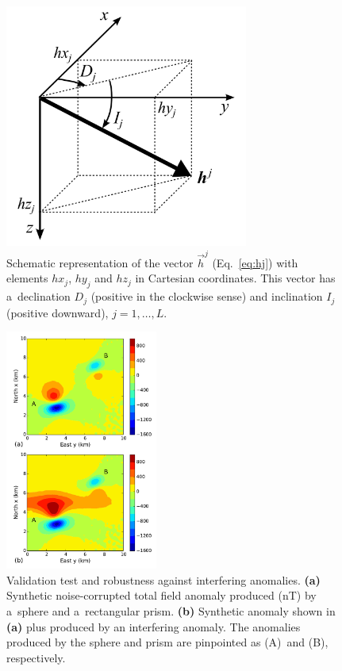 \documentclass[journal abbreviation, npg]{copernicus}
\begin{document}
\begin{figure}[t]
\includegraphics[width=80mm]{Figures/npgd-2014-0069-f02}
\caption{Schematic representation of the vector $\vec{h}^{j}$
  (Eq.~\ref{eq:hj}) with elements $hx_{j}$, $hy_{j}$ and $hz_{j}$ in
  Cartesian coordinates. This vector has a~declination $D_{j}$
  (positive in the clockwise sense) and inclination $I_{j}$ (positive
  downward), $j = 1, \ldots, L$.}
\label{fig:spherical-coordinates}
\end{figure}

\begin{figure}[t]
\includegraphics[width=50mm]{Figures/npgd-2014-0069-f03}
\caption{Validation test and robustness against interfering
  anomalies. \textbf{(a)} Synthetic noise-corrupted total field
  anomaly produced (nT) by a~sphere and a~rectangular
  prism. \textbf{(b)} Synthetic anomaly shown in \textbf{(a)} plus
  produced by an interfering anomaly. The anomalies produced by the
  sphere and prism are pinpointed as (A)~and (B),
  respectively.}
\label{fig:synt1-data}
\end{figure}
\end{document}
